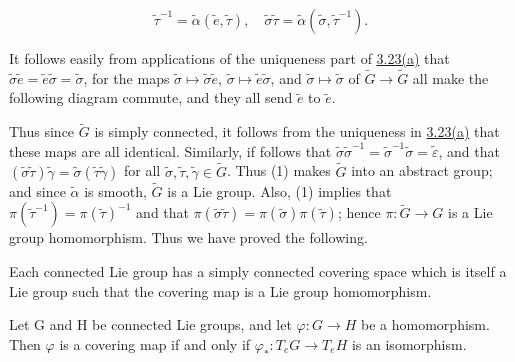 \begin{equation}
\tag{1}\label{eq:3.24:1}
\tilde{\tau}^{-1}=\tilde{\alpha}(\tilde{e},\tilde{\tau}),\quad\tilde{\sigma}\tilde{\tau}=\tilde{\alpha}(\tilde{\sigma},\tilde{\tau}^{-1}).
\end{equation}

It follows easily from applications of the uniqueness part of \hyperref[thm:3.23]{3.23(a)} that $\tilde{\sigma}\tilde{e}=\tilde{e}\tilde{\sigma}=\tilde{\sigma}$, for the maps $\tilde{\sigma}\mapsto\tilde{\sigma}\tilde{e}$, $\tilde{\sigma}\mapsto\tilde{e}\tilde{\sigma}$, and $\tilde{\sigma}\mapsto\tilde{\sigma}$ of $\tilde{G}\to\tilde{G}$ all make the following diagram commute, and they all send $\tilde{e}$ to $\tilde{e}$.

\begin{center}
\end{center}

Thus since $\tilde{G}$ is simply connected, it follows from the uniqueness in \hyperref[thm:3.23]{3.23(a)} that these maps are all identical. Similarly, if follows that $\tilde{\sigma}\tilde{\sigma}^{-1}=\tilde{\sigma}^{-1}\tilde{\sigma}=\tilde{\varepsilon}$, and that $(\tilde{\sigma}\tilde{\tau})\tilde{\gamma}=\tilde{\sigma}(\tilde{\tau}\tilde{\gamma})$ for all $\tilde{\sigma},\tilde{\tau},\tilde{\gamma}\in\tilde{G}$. Thus (1) makes $\tilde{G}$ into an abstract group; and since $\tilde{\alpha}$ is smooth, $\tilde{G}$ is a Lie group. Also, (1) implies that $\pi(\tilde{\tau}^{-1})=\pi(\tilde{\tau})^{-1}$ and that $\pi(\tilde{\sigma}\tilde{\tau})=\pi(\tilde{\sigma})\pi(\tilde{\tau})$; hence $\pi:\tilde{G}\to G$ is a Lie group homomorphism. Thus we have proved the following.

\begin{theorem}\label{thm:3.25}
Each connected Lie group has a simply connected covering space which is itself a Lie group such that the covering map is a Lie group homomorphism.

\end{theorem}

\begin{proposition}\label{thm:3.26}
Let G and H be connected Lie groups, and let $\varphi: G \to H$ be a homomorphism. Then $\varphi$ is a covering map if and only if $\varphi_{*}\colon T_{e} G\to T_{e} H$ is an isomorphism.

\end{proposition}

